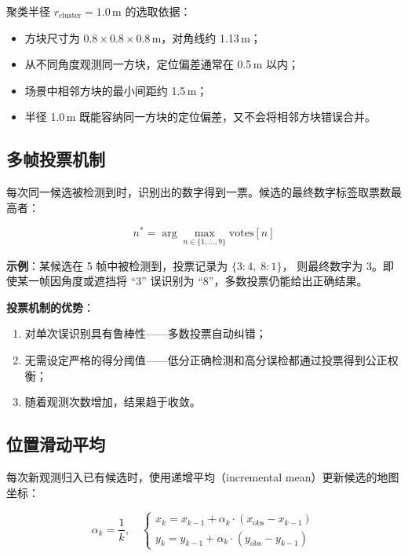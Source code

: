 \documentclass[12pt,a4paper]{article}
\begin{document}
聚类半径 $r_{\text{cluster}} = 1.0$\,m 的选取依据：

\begin{itemize}
  \item 方块尺寸为 $0.8 \times 0.8 \times 0.8$\,m，对角线约 1.13\,m；
  \item 从不同角度观测同一方块，定位偏差通常在 0.5\,m 以内；
  \item 场景中相邻方块的最小间距约 1.5\,m；
  \item 半径 1.0\,m 既能容纳同一方块的定位偏差，又不会将相邻方块错误合并。
\end{itemize}

\subsection{多帧投票机制}

每次同一候选被检测到时，识别出的数字得到一票。候选的最终数字标签取票数最高者：

\begin{equation}
  n^* = \arg\max_{n \in \{1,\dots,9\}} \text{votes}[n]
  \label{eq:voting}
\end{equation}

\textbf{示例}：某候选在 5 帧中被检测到，投票记录为 $\{\text{3}: 4,\; \text{8}: 1\}$，
则最终数字为 3。即使某一帧因角度或遮挡将 ``3'' 误识别为 ``8''，多数投票仍能给出正确结果。

\textbf{投票机制的优势}：
\begin{enumerate}[label=(\arabic*)]
  \item 对单次误识别具有鲁棒性——多数投票自动纠错；
  \item 无需设定严格的得分阈值——低分正确检测和高分误检都通过投票得到公正权衡；
  \item 随着观测次数增加，结果趋于收敛。
\end{enumerate}

\subsection{位置滑动平均}

每次新观测归入已有候选时，使用递增平均（incremental mean）更新候选的地图坐标：

\begin{equation}
  \alpha_k = \frac{1}{k}, \quad
  \begin{cases}
    x_k = x_{k-1} + \alpha_k \cdot (x_{\text{obs}} - x_{k-1}) \\[4pt]
    y_k = y_{k-1} + \alpha_k \cdot (y_{\text{obs}} - y_{k-1})
  \end{cases}
  \label{eq:running_avg}
\end{equation}
\end{document}

